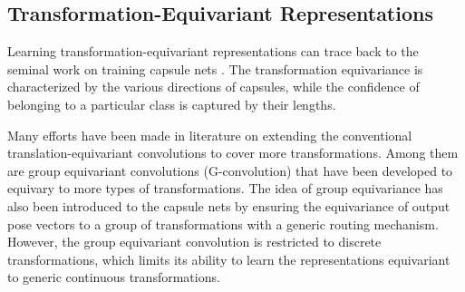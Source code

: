 \documentclass[10pt,journal,compsoc,twoside]{IEEEtran}
\begin{document}
\subsection{Transformation-Equivariant Representations}
Learning transformation-equivariant representations can trace back to the seminal work on training capsule nets \cite{sabour2017dynamic,hinton2011transforming,hinton2018matrix}. The transformation equivariance is characterized by the various directions of capsules, while the confidence of belonging to a particular class is captured by their lengths.

Many efforts have been made in literature  \cite{cohen2016group,cohen2016steerable,lenssen2018group} on extending the conventional translation-equivariant convolutions to cover more transformations.
Among them are group equivariant convolutions (G-convolution) \cite{cohen2016group} that have been developed to equivary to more types of transformations. The idea of group equivariance has also been introduced to the capsule nets \cite{lenssen2018group} by ensuring the equivariance of output pose vectors to a group of transformations with a generic routing mechanism. However, the group equivariant convolution is restricted to discrete transformations, which limits its ability to learn the representations equivariant to generic continuous transformations.




%
%
\end{document}
